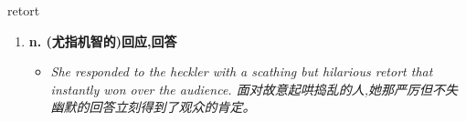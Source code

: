 
\begin{frame}
{\huge retort}
\begin{center}
\begin{enumerate}\Large
  \item \textbf{n. (尤指机智的)回应,回答}
  \begin{itemize}
    \item \em{\Large{She responded to the heckler with a scathing but hilarious retort that instantly won over the audience. 面对故意起哄捣乱的人,她那严厉但不失幽默的回答立刻得到了观众的肯定。}}
  \end{itemize}
\end{enumerate}
\end{center}
\end{frame}
